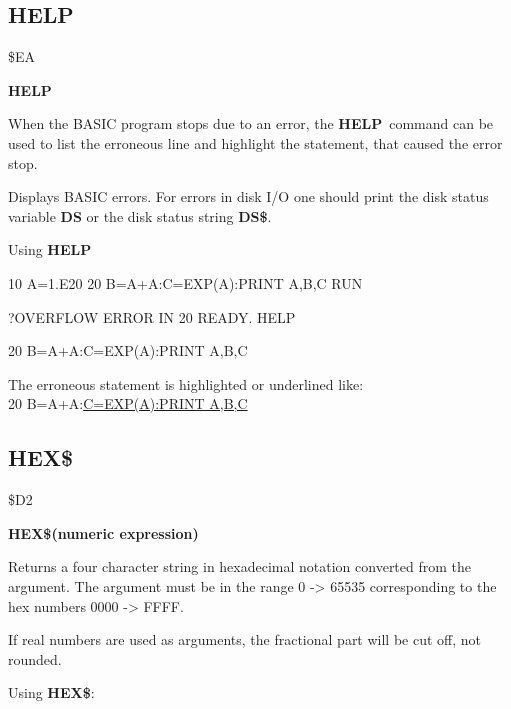 \subsection{HELP}
\begin{description}[leftmargin=3cm,style=nextline]
\item [Token:] \$EA
\item [Format:] {\bf HELP}
\item [Usage:]
   When the BASIC program stops due to an error,
   the {\bf HELP} command can be used to list the erroneous line
   and highlight the statement, that caused the error stop.

\item [Remarks:]
      Displays BASIC errors. For errors in disk
      I/O one should print the disk status variable {\bf DS}
      or the disk status string {\bf DS\$}.

\item [Example:] Using {\bf HELP}
\begin{screenoutput}
10 A=1.E20
20 B=A+A:C=EXP(A):PRINT A,B,C
RUN

?OVERFLOW ERROR IN 20
READY.
HELP

20 B=A+A:C=EXP(A):PRINT A,B,C
\end{screenoutput}
The erroneous statement is highlighted or underlined like: \\
20 B=A+A:\underline{C=EXP(A):PRINT A,B,C}
\end{description}


\newpage
\subsection{HEX\$}
\begin{description}[leftmargin=3cm,style=nextline]
\item [Token:] \$D2
\item [Format:] {\bf HEX\$(numeric expression)}
\item [Usage:] Returns a four
               character string in hexadecimal notation
               converted from the argument.
               The argument must be in the range 0 -> 65535
               corresponding to the hex numbers 0000 -> FFFF.

\item [Remarks:] If real numbers are used as arguments, the
                 fractional part will be cut off, not rounded.

\item [Example:] Using {\bf HEX\$}:
\end{description}

